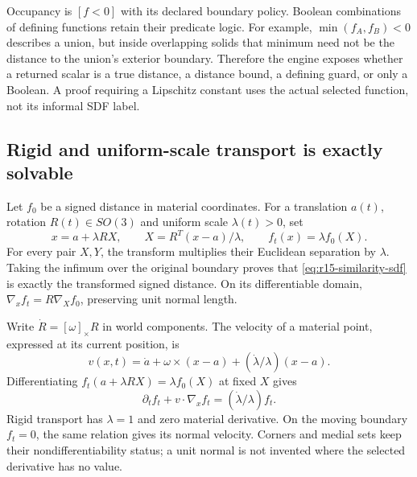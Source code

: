 Occupancy is $[f<0]$ with its declared boundary policy. Boolean combinations
of defining functions retain their predicate logic. For example,
$\min(f_A,f_B)<0$ describes a union, but inside overlapping solids that
minimum need not be the distance to the union's exterior boundary. Therefore
the engine exposes whether a returned scalar is a true distance, a distance
bound, a defining guard, or only a Boolean. A proof requiring a Lipschitz
constant uses the actual selected function, not its informal SDF label.

\subsection{Rigid and uniform-scale transport is exactly solvable}
Let $f_0$ be a signed distance in material coordinates. For a translation
$a(t)$, rotation $R(t)\in SO(3)$ and uniform scale $\lambda(t)>0$, set
\begin{equation}
 x=a+\lambda R X,\qquad X=R^T(x-a)/\lambda,
 \qquad f_t(x)=\lambda f_0(X).
 \label{eq:r15-similarity-sdf}
\end{equation}
For every pair $X,Y$, the transform multiplies their Euclidean separation by
$\lambda$. Taking the infimum over the original boundary proves that
\eqref{eq:r15-similarity-sdf} is exactly the transformed signed distance.
On its differentiable domain, $\nabla_x f_t=R\nabla_Xf_0$, preserving unit
normal length.

Write $\dot R=[\omega]_\times R$ in world components. The velocity of a
material point, expressed at its current position, is
\begin{equation}
 v(x,t)=\dot a+\omega\times(x-a)+(\dot\lambda/\lambda)(x-a).
 \label{eq:r15-material-velocity}
\end{equation}
Differentiating $f_t(a+\lambda RX)=\lambda f_0(X)$ at fixed $X$ gives
\begin{equation}
 \partial_t f_t+v\cdot\nabla_x f_t=(\dot\lambda/\lambda)f_t.
 \label{eq:r15-sdf-material-rate}
\end{equation}
Rigid transport has $\lambda=1$ and zero material derivative. On the moving
boundary $f_t=0$, the same relation gives its normal velocity. Corners and
medial sets keep their nondifferentiability status; a unit normal is not
invented where the selected derivative has no value.


